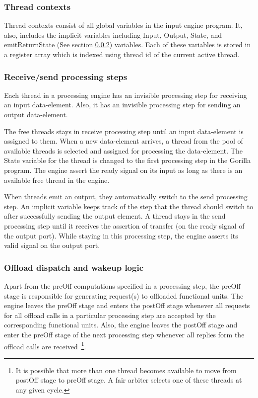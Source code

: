 \documentclass[a4paper, 12pt]{report}
\begin{document}
\subsubsection{Thread contexts}
Thread contexts consist of all global variables in the 
input engine program. It, also, includes the implicit 
variables including Input, Output, State, and emitReturnState 
(See section \ref{sec:rcvSend}) variables. Each of these 
variables is stored in a register array which is indexed using 
thread id of the current active thread.  

\subsubsection{Receive/send processing steps}
\label{sec:rcvSend}
Each thread in a processing engine has an invisible 
processing step for receiving an input data-element. 
Also, it has an invisible processing step for sending 
an output data-element.

The free threads stays in receive processing step 
until an input data-element is assigned to them.
When a new data-element arrives, a thread from the 
pool of available threads is selected and assigned 
for processing the data-element. The State variable 
for the thread is changed to the first processing 
step in the Gorilla program. The engine assert the 
ready signal on its input as long as there is an 
available free thread in the engine.
  
When threads emit an output, they automatically switch 
to the send processing step. An implicit variable keeps 
track of the step that the thread should switch to after 
successfully sending the output element. A thread stays 
in the send processing step until it receives the assertion 
of transfer (on the ready signal of the output port). While 
staying in this processing step, the engine asserts its valid 
signal on the output port.
 
\subsubsection{Offload dispatch and wakeup logic}
Apart from the preOff computations specified in a 
processing step, the preOff stage is responsible 
for generating request(s) to offloaded functional units. 
The engine leaves the preOff stage and enters the postOff 
stage whenever all requests for all offload calls in a 
particular processing step are accepted by the 
corresponding functional units.  Also, the engine leaves 
the postOff stage and enter the preOff stage of the next 
processing step whenever all replies form the offload calls 
are received~\footnote{It is possible that more than one 
thread becomes available to move from postOff stage to preOff stage. 
A fair arbiter selects one of these threads at any given cycle.}. 
\end{document}
